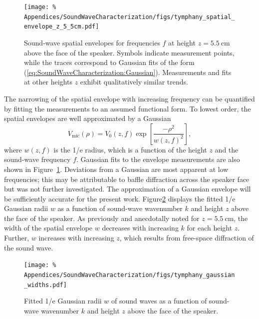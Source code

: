 \begin{figure}
  \centering
  \texttt{[image: \%
    Appendices/SoundWaveCharacterization/figs/tymphany\_spatial\_envelope\_z\_5\_5cm.pdf]}
  \caption[Representative spatial envelopes of sound waves]{%
    Sound-wave spatial envelopes for frequencies $f$
    at height $z = \SI{5.5}{\centi\meter}$ above the face of the speaker.
    Symbols indicate measurement points, while
    the traces correspond to Gaussian fits of the form
    (\ref{eq:SoundWaveCharacterization:Gaussian}).
    Measurements and fits at other heights $z$
    exhibit qualitatively similar trends.
  }
\label{fig:SoundWaveCharacterization:tymphany_spatial_envelope_z_5_5cm}
\end{figure}

The narrowing of the spatial envelope with increasing frequency
can be quantified by fitting the measurements
to an assumed functional form.
To lowest order, the spatial envelopes are well approximated by a Gaussian
\begin{equation}
  V_{\text{mic}}(\rho)
  =
  V_0(z, f)
  \exp\left[
    \frac{-\rho^2}{w(z, f)^2}
  \right],
  \label{eq:SoundWaveCharacterization:Gaussian}
\end{equation}
where $w(z, f)$ is the 1/e radius, which
is a function of the height $z$ and the sound-wave frequency $f$.
Gaussian fits to the envelope measurements are also shown in
Figure~\ref{fig:SoundWaveCharacterization:tymphany_spatial_envelope_z_5_5cm}.
Deviations from a Gaussian are most apparent at low frequencies;
this may be attributable to baffle diffraction across the speaker face but
was not further investigated.
The approximation of a Gaussian envelope
will be sufficiently accurate for the present work.
Figure\ref{fig:SoundWaveCharacterization:tymphany_gaussian_widths}
displays the fitted 1/e Gaussian radii $w$ as a function of
sound-wave wavenumber $k$ and
height $z$ above the face of the speaker.
As previously and anecdotally noted for $z = \SI{5.5}{\centi\meter}$,
the width of the spatial envelope $w$
decreases with increasing $k$ for each height $z$.
Further, $w$ increases with increasing $z$, which
results from free-space diffraction of the sound wave.

\begin{figure}
  \centering
  \texttt{[image: \%
    Appendices/SoundWaveCharacterization/figs/tymphany\_gaussian\_widths.pdf]}
  \caption[Gaussian widths of sound waves]{%
    Fitted 1/e Gaussian radii $w$ of sound waves
    as a function of sound-wave wavenumber $k$ and
    height $z$ above the face of the speaker.
  }
\label{fig:SoundWaveCharacterization:tymphany_gaussian_widths}
\end{figure}


